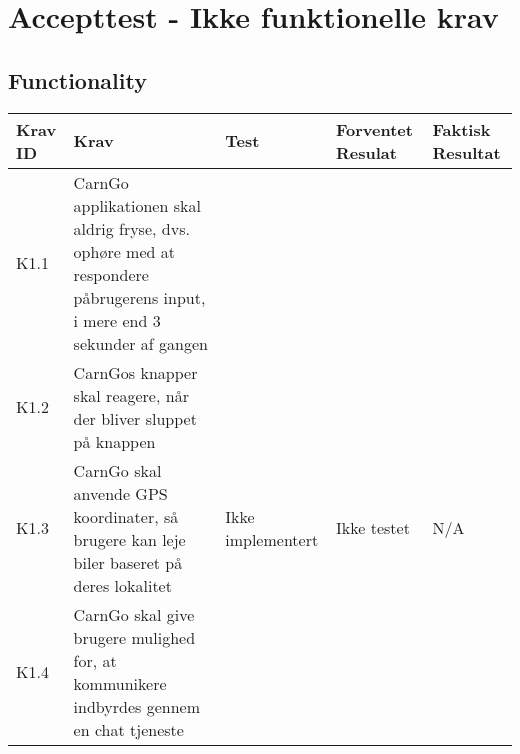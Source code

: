 \documentclass[Accepttestspecifikation/Accepttest_Main.tex]{subfiles}
\begin{document}
\section{Accepttest - Ikke funktionelle krav}\label{sec:Ikkefunktionel}


\subsection{Functionality}
\begin{table}[H]
\centering
\begin{tabular}{|L{0.07\textwidth}|L{0.2\textwidth}|L{0.2\textwidth}|L{0.2\textwidth}|L{0.2\textwidth}|}
\hline
\textbf{Krav ID} & \textbf{Krav} & \textbf{Test} & \textbf{Forventet Resulat} & \textbf{Faktisk Resultat} \\ \hline
K1.1 & CarnGo applikationen skal aldrig fryse, dvs. ophøre med at respondere påbrugerens input, i mere end 3 sekunder af gangen &  &  &  \\ \hline
K1.2 & CarnGos knapper skal reagere, når der bliver sluppet på knappen &  &  &  \\ \hline
K1.3 & CarnGo skal anvende GPS koordinater, så brugere kan leje biler baseret på deres lokalitet & Ikke implementert & Ikke testet & N/A \\ \hline
K1.4 & CarnGo skal give brugere mulighed for, at kommunikere indbyrdes gennem en chat tjeneste &  &  &  \\ \hline
\end{tabular}
\end{table}
\end{document}
